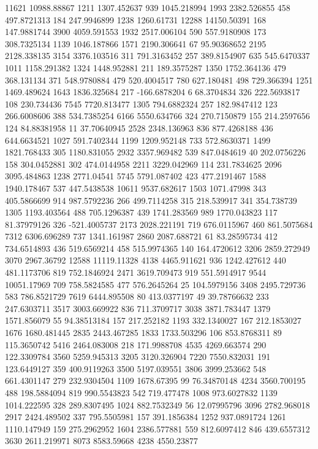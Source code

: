 11621	10988.88867
1211	1307.452637
939	1045.218994
1993	2382.526855
458	497.8721313
184	247.9946899
1238	1260.61731
12288	14150.50391
168	147.9881744
3900	4059.591553
1932	2517.006104
590	557.9180908
173	308.7325134
1139	1046.187866
1571	2190.306641
67	95.90368652
2195	2128.338135
3154	3376.103516
311	791.3163452
257	389.8154907
635	545.6470337
1011	1158.291382
1324	1448.952881
211	189.3575287
1350	1752.364136
479	368.131134
371	548.9780884
479	520.4004517
780	627.180481
498	729.366394
1251	1469.489624
1643	1836.325684
217	-166.6878204
6	68.3704834
326	222.5693817
108	230.734436
7545	7720.813477
1305	794.6882324
257	182.9847412
123	266.6008606
388	534.7385254
6166	5550.634766
324	270.7150879
155	214.2597656
124	84.88381958
11	37.70640945
2528	2348.136963
836	877.4268188
436	644.6634521
1027	591.7402344
1199	1209.952148
733	572.8630371
1499	1821.768433
305	1180.831055
2932	3357.969482
539	847.0484619
40	202.0756226
158	304.0452881
302	474.0144958
2211	3229.042969
114	231.7834625
2096	3095.484863
1238	2771.04541
5745	5791.087402
423	477.2191467
1588	1940.178467
537	447.5438538
10611	9537.682617
1503	1071.47998
343	405.5866699
914	987.5792236
266	499.7114258
315	218.539917
341	354.738739
1305	1193.403564
488	705.1296387
439	1741.283569
989	1770.043823
117	81.37979126
326	-521.4005737
2173	2028.221191
719	676.0115967
460	861.5075684
7312	6306.696289
737	1341.161987
2860	2087.688721
61	83.28595734
412	734.6514893
436	519.6569214
458	515.9974365
140	164.4720612
3206	2859.272949
3070	2967.36792
12588	11119.11328
4138	4465.911621
936	1242.427612
440	481.1173706
819	752.1846924
2471	3619.709473
919	551.5914917
9544	10051.17969
709	758.5824585
477	576.2645264
25	104.5979156
3408	2495.729736
583	786.8521729
7619	6444.895508
80	413.0377197
49	39.78766632
233	247.6303711
3517	3003.669922
836	711.3709717
3038	3871.783447
1379	1571.856079
55	94.38513184
157	217.252182
1193	332.1340027
167	212.1853027
1676	1680.481445
2835	2443.467285
1833	1733.503296
106	853.8768311
89	115.3650742
5416	2464.083008
218	171.9988708
4535	4269.663574
290	122.3309784
3560	5259.945313
3205	3120.326904
7220	7550.832031
191	123.6449127
359	400.9119263
3500	5197.039551
3806	3999.253662
548	661.4301147
279	232.9304504
1109	1678.67395
99	76.34870148
4234	3560.700195
488	198.5884094
819	990.5543823
542	719.477478
1008	973.6027832
1139	1014.222595
328	289.8307495
1024	882.7532349
56	12.07995796
3096	2782.968018
2917	2424.489502
337	795.5505981
157	391.1856384
1252	937.0891724
1261	1110.147949
159	275.2962952
1604	2386.577881
559	812.6097412
846	439.6557312
3630	2611.219971
8073	8583.59668
4238	4550.23877
